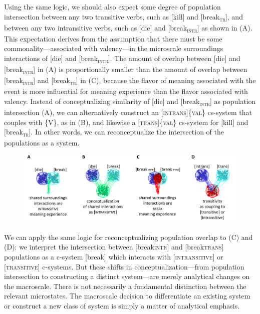   Using the same logic, we should also expect some degree of population intersection between any two transitive verbs, such as [kill] and [break\textsc{\textsubscript{tr}}], and between any two intransitive verbs, such as [die] and [break\textsc{\textsubscript{intr}}] as shown in (A). This expectation derives from the assumption that there must be some commonality—associated with valency—in the microscale surroundings interactions of [die] and [break\textsc{\textsubscript{intr}}]. The amount of overlap between [die] and [break\textsc{\textsubscript{intr}}] in (A) is proportionally smaller than the amount of overlap between [break\textsc{\textsubscript{intr}}] and [break\textsc{\textsubscript{tr}}] in (C), because the flavor of meaning associated with the event is more influential for meaning experience than the flavor associated with valency. Instead of conceptualizing similarity of [die] and [break\textsc{\textsubscript{intr}}] as population intersection (A), we can alternatively construct an [\textsc{intrans}]\{\textsc{val}\} cs-system that couples with \{V\}, as in (B), and likewise a [\textsc{trans}]\{\textsc{val}\} cs-system for [kill] and [break\textsc{\textsubscript{tr}}]. In other words, we can reconceptualize the intersection of the populations as a system.

  
\begin{figure}
\includegraphics[width=\textwidth]{figures/Tilsen-img73.png}
\caption{\missingcaption}
\label{fig:4:23}
\end{figure}
 

  We can apply the same logic for reconceptualizing population overlap to (C) and (D): we interpret the intersection between [break\textsc{intr}] and [break\textsc{trans}] populations as a c-system [break] which interacts with [\textsc{intransitive}] or [\textsc{transitive}] c-systems. But these shifts in conceptualization—from population intersection to constructing a distinct system—are merely analytical changes on the macroscale. There is not necessarily a fundamental distinction between the relevant microstates. The macroscale decision to differentiate an existing system or construct a new class of system is simply a matter of analytical emphasis.

